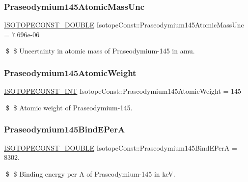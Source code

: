\subsubsection{\texorpdfstring{Praseodymium145\+Atomic\+Mass\+Unc}{Praseodymium145AtomicMassUnc}}
{\footnotesize\ttfamily \mbox{\hyperlink{group___isotope_const-_macros_ga8f45a7272ce02c0b4c65c44636ed719a}{I\+S\+O\+T\+O\+P\+E\+C\+O\+N\+S\+T\+\_\+\+D\+O\+U\+B\+LE}} Isotope\+Const\+::\+Praseodymium145\+Atomic\+Mass\+Unc = 7.\+696e-\/06}

\$ \$ Uncertainty in atomic mass of Praseodymium-\/145 in amu. \mbox{\label{group___isotope_const-_praseodymium-_pr145_gad599086dcdd8a4f5232b07113a470022}} 
\subsubsection{\texorpdfstring{Praseodymium145\+Atomic\+Weight}{Praseodymium145AtomicWeight}}
{\footnotesize\ttfamily \mbox{\hyperlink{group___isotope_const-_macros_ga5f18360b3e99483a35c32d789e62621c}{I\+S\+O\+T\+O\+P\+E\+C\+O\+N\+S\+T\+\_\+\+I\+NT}} Isotope\+Const\+::\+Praseodymium145\+Atomic\+Weight = 145}

\$ \$ Atomic weight of Praseodymium-\/145. \mbox{\label{group___isotope_const-_praseodymium-_pr145_gab7530400611f59ec10285e67d3c6d076}} 
\subsubsection{\texorpdfstring{Praseodymium145\+Bind\+E\+PerA}{Praseodymium145BindEPerA}}
{\footnotesize\ttfamily \mbox{\hyperlink{group___isotope_const-_macros_ga8f45a7272ce02c0b4c65c44636ed719a}{I\+S\+O\+T\+O\+P\+E\+C\+O\+N\+S\+T\+\_\+\+D\+O\+U\+B\+LE}} Isotope\+Const\+::\+Praseodymium145\+Bind\+E\+PerA = 8302.}

\$ \$ Binding energy per A of Praseodymium-\/145 in keV. \mbox{\label{group___isotope_const-_praseodymium-_pr145_gaa66f6e2cd99b1456afbffb57e207d534}} 
